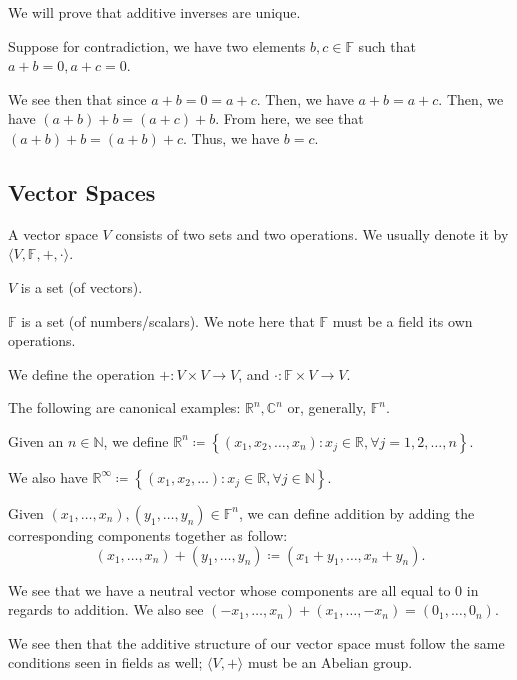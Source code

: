 \documentclass[openany]{book}
\newcommand{\CC}{\mathbb{C}}
\newcommand{\NN}{\mathbb{N}}
\newcommand{\RR}{\mathbb{R}}
\begin{document}
	\begin{rmk}
		We will prove that additive inverses are unique.
		
		Suppose for contradiction, we have two elements $b, c \in \mathbb{F}$ such that $a + b = 0, a + c = 0$.
		
		We see then that since $a + b = 0 = a + c$. Then, we have $a + b = a + c$. Then, we have $(a + b) + b = (a + c) + b$. From here, we see that $(a + b) + b = (a + b) + c$. Thus, we have $b = c$.
	\end{rmk}
	
	\subsection{Vector Spaces}
	\begin{defn}
		A vector space $V$ consists of two sets and two operations. We usually denote it by $\langle V, \mathbb{F}, +, \cdot \rangle$.
		
		$V$ is a set (of vectors).
		
		$\mathbb{F}$ is a set (of numbers/scalars). We note here that $\mathbb{F}$ must be a field its own operations.
		
		We define the operation $+ : V \times V \rightarrow V$, and $\cdot : \mathbb{F} \times V \rightarrow V$.
	\end{defn}
	
	\begin{example}
		The following are canonical examples: $\RR^{n}, \CC^{n}$ or, generally, $\mathbb{F}^{n}$.
		
		Given an $n \in \NN$, we define $\RR^{n} \coloneq \left\{  \left( x_{1}, x_{2}, \ldots, x_{n} \right) : x_{j} \in \RR, \forall j = 1, 2, \ldots, n  \right\}$.
		
		We also have $\RR^{\infty} \coloneq \left\{  \left( x_{1}, x_{2}, \ldots \right) : x_{j} \in \RR, \forall j \in \NN\right\}$.
	\end{example}
	
	
	\begin{defn}
		Given $\left( x_{1}, \ldots, x_{n} \right), \left( y_{1}, \ldots, y_{n} \right) \in \mathbb{F}^{n}$, we can define addition by adding the corresponding components together as follow:
		\begin{equation*}
			\left( x_{1}, \ldots, x_{n} \right) + \left( y_{1}, \ldots, y_{n} \right) \coloneq \left( x_{1} + y_{1}, \ldots, x_{n} + y_{n} \right).
		\end{equation*}
		
		We see that we have a neutral vector whose components are all equal to $0$ in regards to addition. We also see $\left( -x_{1}, \ldots, x_{n} \right) + \left( x_{1}, \ldots, -x_{n} \right) = \left( 0_{1}, \ldots, 0_{n} \right)$.
		
		We see then that the additive structure of our vector space must follow the same conditions seen in fields as well; $\langle V, + \rangle$ must be an Abelian group. 
	\end{defn}
	
\end{document}
